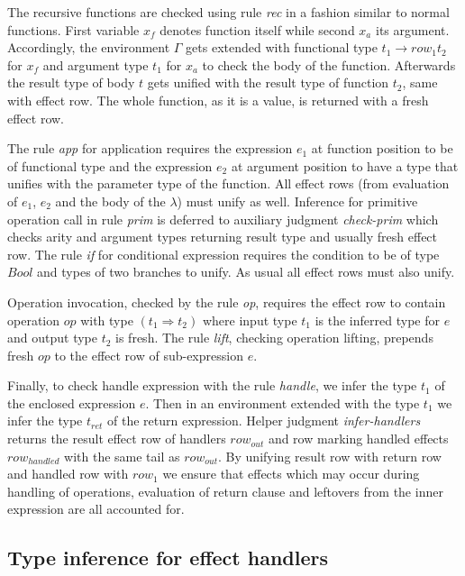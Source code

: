\documentclass[inz, english, longabstract]{iithesis}
\begin{document}
The recursive functions are checked using rule \emph{rec} in a fashion similar to normal functions.
First variable $x_f$ denotes function itself while second $x_a$ its argument.
Accordingly, the environment $\Gamma$ gets extended with functional type $ t_1 \rightarrow row_1 t_2 $ for $x_f$ and argument type $ t_1 $ for $x_a$ to check the body of the function.
Afterwards the result type of body $ t $ gets unified with the result type of function $ t_2 $, same with effect row.
The whole function, as it is a value, is returned with a fresh effect row.

The rule \emph{app} for application requires the expression $e_1$ at function position to be of functional type and the expression $e_2$ at argument position to have a type that unifies with the parameter type of the function. 
All effect rows (from evaluation of $e_1$, $e_2$ and the body of the $\lambda$) must unify as well.
Inference for primitive operation call in rule \emph{prim} is deferred to auxiliary judgment \emph{check-prim} which checks arity and argument types returning result type and usually fresh effect row.
The rule \emph{if} for conditional expression requires the condition to be of type $ Bool $ and types of two branches to unify.
As usual all effect rows must also unify.

Operation invocation, checked by the rule \emph{op}, requires the effect row to contain operation $ op $ with type $ (t_1 \Rightarrow t_2) $ where input type $ t_1 $ is the inferred type for $ e $ and output type $ t_2 $ is fresh.
The rule \emph{lift}, checking operation lifting, prepends fresh $ op $ to the effect row of sub-expression $e$.

Finally, to check handle expression with the rule \emph{handle}, we infer the type $t_1$ of the enclosed expression $e$.
Then in an environment extended with the type $t_1$ we infer the type $t_{ret}$ of the return expression.
Helper judgment \textit{infer-handlers} returns the result effect row of handlers $row_{out}$ and row marking handled effects $ row_{handled} $ with the same tail as $row_{out}$.
By unifying result row with return row and handled row with $row_1$ we ensure that effects which may occur during handling of operations, evaluation of return clause and leftovers from the inner expression are all accounted for.

\subsection{Type inference for effect handlers}
\end{document}
